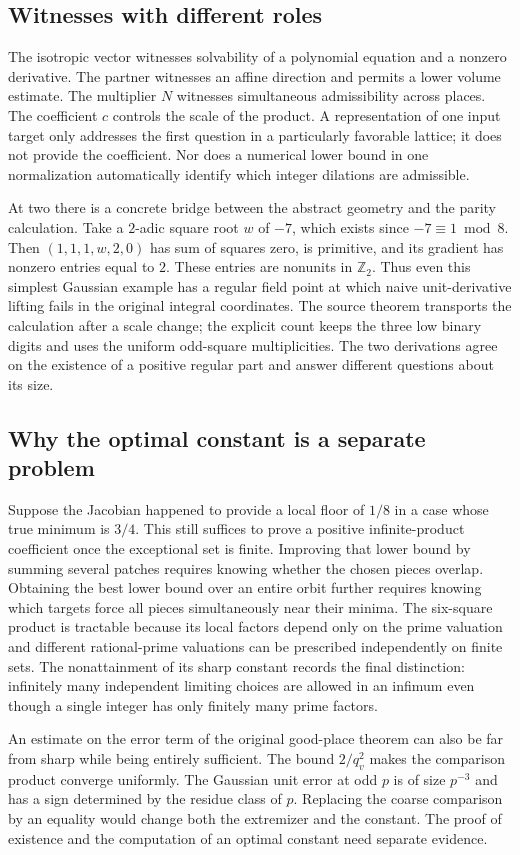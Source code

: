 \documentclass[12pt,letterpaper]{article}
\begin{document}
\subsection{Witnesses with different roles}
The isotropic vector witnesses solvability of a polynomial equation and a nonzero derivative. The partner witnesses an affine direction and permits a lower volume estimate. The multiplier $N$ witnesses simultaneous admissibility across places. The coefficient $c$ controls the scale of the product. A representation of one input target only addresses the first question in a particularly favorable lattice; it does not provide the coefficient. Nor does a numerical lower bound in one normalization automatically identify which integer dilations are admissible.
\par
At two there is a concrete bridge between the abstract geometry and the parity calculation. Take a $2$-adic square root $w$ of $-7$, which exists since $-7\equiv1\bmod8$. Then $(1,1,1,w,2,0)$ has sum of squares zero, is primitive, and its gradient has nonzero entries equal to $2$. These entries are nonunits in $\mathbb Z_2$. Thus even this simplest Gaussian example has a regular field point at which naive unit-derivative lifting fails in the original integral coordinates. The source theorem transports the calculation after a scale change; the explicit count keeps the three low binary digits and uses the uniform odd-square multiplicities. The two derivations agree on the existence of a positive regular part and answer different questions about its size.
\subsection{Why the optimal constant is a separate problem}
Suppose the Jacobian happened to provide a local floor of $1/8$ in a case whose true minimum is $3/4$. This still suffices to prove a positive infinite-product coefficient once the exceptional set is finite. Improving that lower bound by summing several patches requires knowing whether the chosen pieces overlap. Obtaining the best lower bound over an entire orbit further requires knowing which targets force all pieces simultaneously near their minima. The six-square product is tractable because its local factors depend only on the prime valuation and different rational-prime valuations can be prescribed independently on finite sets. The nonattainment of its sharp constant records the final distinction: infinitely many independent limiting choices are allowed in an infimum even though a single integer has only finitely many prime factors.
\par
An estimate on the error term of the original good-place theorem can also be far from sharp while being entirely sufficient. The bound $2/q_v^2$ makes the comparison product converge uniformly. The Gaussian unit error at odd $p$ is of size $p^{-3}$ and has a sign determined by the residue class of $p$. Replacing the coarse comparison by an equality would change both the extremizer and the constant. The proof of existence and the computation of an optimal constant need separate evidence.
\end{document}
